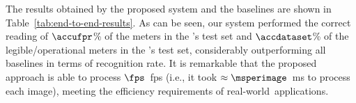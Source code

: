


The results obtained by the proposed system and the baselines are shown in Table~\ref{tab:end-to-end-results}.
As can be seen, our system performed the correct reading of $\accufpr$\% of the meters in the \ufpramr's test set and $\accdataset$\% of the legible/operational meters in the \dataset's test set, considerably outperforming all baselines in terms of recognition rate.
It is remarkable that the proposed approach is able to process $\fps$~\gls*{fps} (i.e., it took $\approx\msperimage$~ms to process each image), meeting the efficiency requirements of real-world~applications.

